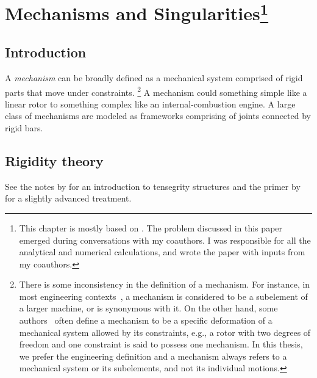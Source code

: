 
\chapter[Mechanisms and Singularities]{Mechanisms and Singularities\footnote{%
  This chapter is mostly based on .
  The problem discussed in this paper emerged during conversations with my coauthors.
  I was responsible for all the analytical and numerical calculations, and wrote the paper with inputs from my coauthors.
}}


\section{Introduction}

A \emph{mechanism} can be broadly defined as a mechanical system comprised of rigid parts that move under constraints.%
\footnote{There is some inconsistency in the definition of a mechanism.
  For instance, in most engineering contexts~\cite{hartenberg1964,hunt1978,myszka2012}, a mechanism is considered to be a subelement of a larger machine, or is synonymous with it.
  On the other hand, some authors~\cite{connelly2022} often define a mechanism to be a specific deformation of a mechanical system allowed by its constraints, e.g., a rotor with two degrees of freedom and one constraint is said to possess one mechanism.
  In this thesis, we prefer the engineering definition and a mechanism always refers to a mechanical system or its subelements, and not its individual motions.}
A mechanism could something simple like a linear rotor to something complex like an internal-combustion engine.
A large class of mechanisms are modeled as frameworks comprising of joints connected by rigid bars.

\section{Rigidity theory}

See the notes by \citet{connelly2022} for an introduction to tensegrity structures and the primer by \citet{williams2003} for a slightly advanced treatment.


